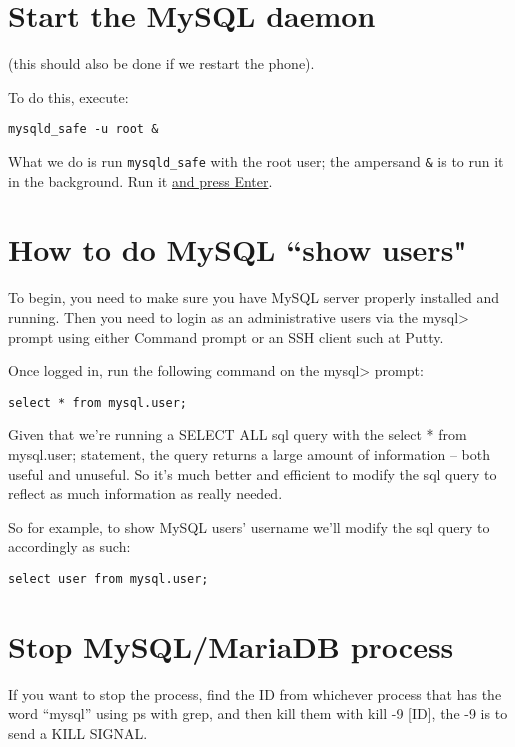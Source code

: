 \documentclass[11pt]{article}
\begin{document}
\section{Start the MySQL daemon}
\label{sec:orgddc671c}
(this should also be done if we restart the phone).

To do this, execute:

\begin{verbatim}
mysqld_safe -u root &
\end{verbatim}

What we do is run \texttt{mysqld\_safe} with the root user; the ampersand \texttt{\&} is to run it in the background.
Run it \uline{and press Enter}. 

\section{How to do MySQL “show users"}
\label{sec:orge7f5c29}


To begin, you need to make sure you have MySQL server properly installed and running. Then you need to login as an administrative users via the mysql> prompt using either Command prompt or an SSH client such at Putty.

Once logged in, run the following command on the mysql> prompt:

\begin{verbatim}
select * from mysql.user;
\end{verbatim}


Given that we’re running a SELECT ALL sql query with the select * from mysql.user; statement, the query returns a large amount of information – both useful and unuseful. So it’s much better and efficient to modify the sql query to reflect as much information as really needed.

So for example, to show MySQL users’ username we’ll modify the sql query to accordingly as such:

\begin{verbatim}
select user from mysql.user;
\end{verbatim}


\section{Stop MySQL/MariaDB process}
\label{sec:orge063770}
If you want to stop the process, find the ID from whichever process that has the word “mysql” using ps with grep, and then kill them with kill -9 [ID], the -9 is to send a KILL SIGNAL.
\end{document}
